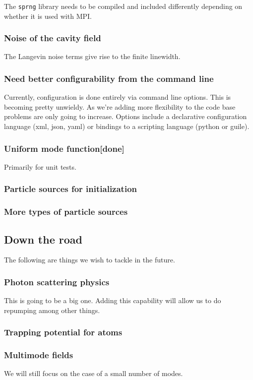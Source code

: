 \documentclass[aps, superscriptaddress, groupedaddress, preprint]{revtex4}
\begin{document}
The \verb~sprng~ library needs to be compiled and included
differently depending on whether it is used with MPI\@.


\subsubsection{Noise of the cavity field}

The Langevin noise terms give rise to the finite linewidth.


\subsubsection{Need better configurability from the command line}

Currently, configuration is done entirely via command line
options.  This is becoming pretty unwieldy.  As we're adding more
flexibility to  the code base problems are only going to
increase.  Options include a declarative configuration language
(xml, json, yaml) or bindings to a scripting language (python or
guile).


\subsubsection{Uniform mode function{\bf [done]}}

Primarily for unit tests.


\subsubsection{Particle sources for initialization}


\subsubsection{More types of particle sources}


\subsection{Down the road}

The following are things we wish to tackle in the future.


\subsubsection{Photon scattering physics} This is going to be a big
one.  Adding this capability will allow us to do repumping among
other things.


\subsubsection{Trapping potential for atoms}


\subsubsection{Multimode fields} We will still focus on the case
of a small number of modes.
\end{document}
